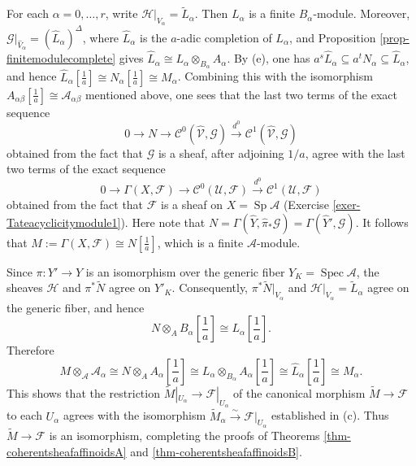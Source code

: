 \documentclass[a4paper,12pt, dvipdfmx]{jsbook}
\def\til#1{\widetilde{#1}}%
\def\Spec{\mathop{\mathrm{Spec}}\nolimits}
\def\Sp{\mathop{\mathrm{Sp}}\nolimits}
\theoremstyle{plain}
\theoremstyle{definition}
\begin{document}
For each $\alpha=0,\ldots,r$, write $\mathscr{H}|_{V_{\alpha}}=\til{L}_{\alpha}$.
Then $L_{\alpha}$ is a finite $B_{\alpha}$-module.
Moreover, $\mathscr{G}|_{\widehat{V}_{\alpha}}=(\widehat{L}_{\alpha})^{\Delta}$, where $\widehat{L}_{\alpha}$ is the $a$-adic completion of $L_{\alpha}$, and Proposition \ref{prop-finitemodulecomplete} gives $\widehat{L}_{\alpha}\cong L_{\alpha}\otimes_{B_{\alpha}}A_{\alpha}$.
By (e), one has $a^s\widehat{L}_{\alpha}\subseteq a^tN_{\alpha}\subseteq\widehat{L}_{\alpha}$, and hence $\widehat{L}_{\alpha}[\frac{1}{a}]\cong N_{\alpha}[\frac{1}{a}]\cong M_{\alpha}$.
Combining this with the isomorphism $A_{\alpha\beta}[\frac{1}{a}]\cong\mathcal{A}_{\alpha\beta}$ mentioned above, one sees that the last two terms of the exact sequence
$$
0\longrightarrow N\longrightarrow\mathcal{C}^0(\widehat{\mathcal{V}},\mathscr{G})\stackrel{d^0}{\longrightarrow}\mathcal{C}^1(\widehat{\mathcal{V}},\mathscr{G})
$$
obtained from the fact that $\mathscr{G}$ is a sheaf, after adjoining $1/a$, agree with the last two terms of the exact sequence
$$
0\longrightarrow\Gamma(X,\mathscr{F})\longrightarrow\mathcal{C}^0(\mathcal{U},\mathscr{F})\stackrel{d^0}{\longrightarrow}\mathcal{C}^1(\mathcal{U},\mathscr{F})
$$
obtained from the fact that $\mathscr{F}$ is a sheaf on $X=\Sp\mathcal{A}$ (Exercise \ref{exer-Tateacyclicitymodule1}).
Here note that $N=\Gamma(\widehat{Y},\widehat{\pi}_{\ast}\mathscr{G})=\Gamma(\widehat{Y}',\mathscr{G})$.
It follows that $M:=\Gamma(X,\mathscr{F})\cong N[\frac{1}{a}]$, which is a finite $\mathcal{A}$-module.

Since $\pi\colon Y'\rightarrow Y$ is an isomorphism over the generic fiber $Y_K=\Spec\mathcal{A}$, the sheaves $\mathscr{H}$ and $\pi^{\ast}\til{N}$ agree on $Y'_K$.
Consequently, $\pi^{\ast}\til{N}|_{V_{\alpha}}$ and $\mathscr{H}|_{V_{\alpha}}=\til{L}_{\alpha}$ agree on the generic fiber, and hence
$$
{\textstyle N\otimes_AB_{\alpha}[\frac{1}{a}]\cong L_{\alpha}[\frac{1}{a}]}.
$$
Therefore
$$
{\textstyle M\otimes_{\mathcal{A}}\mathcal{A}_{\alpha}\cong N\otimes_AA_{\alpha}[\frac{1}{a}]\cong L_{\alpha}\otimes_{B_{\alpha}}A_{\alpha}[\frac{1}{a}]\cong \widehat{L}_{\alpha}[\frac{1}{a}]\cong M_{\alpha}}.
$$
This shows that the restriction $\til{M}|_{U_{\alpha}}\rightarrow\mathscr{F}|_{U_{\alpha}}$ of the canonical morphism $\til{M}\rightarrow\mathscr{F}$ to each $U_{\alpha}$ agrees with the isomorphism $\til{M}_{\alpha}\stackrel{\sim}{\rightarrow}\mathscr{F}|_{U_{\alpha}}$ established in (c).
Thus $\til{M}\rightarrow\mathscr{F}$ is an isomorphism, completing the proofs of Theorems \ref{thm-coherentsheafaffinoidsA} and \ref{thm-coherentsheafaffinoidsB}.
\end{document}
